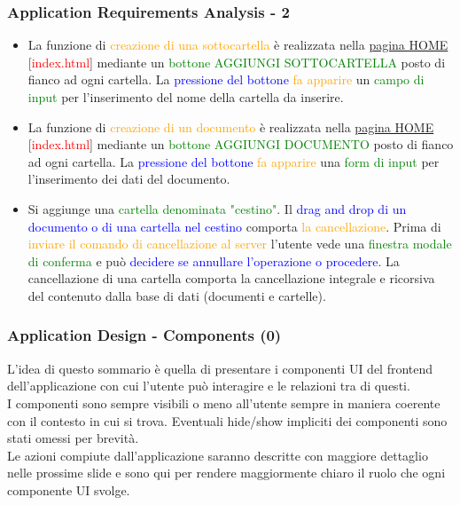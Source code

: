 \documentclass[aspectratio=169, dvipsnames]{beamer}
\begin{document}
\begin{frame}
    \frametitle{Application Requirements Analysis - 2}
    \begin{itemize}
        \item La funzione di \textcolor{Orange}{creazione di una sottocartella} è realizzata nella
              \underline{pagina HOME} [\textcolor{Red}{index.html}] mediante un
              \textcolor{Green}{bottone AGGIUNGI SOTTOCARTELLA} posto di fianco ad ogni cartella. La
              \textcolor{Blue}{pressione del bottone} \textcolor{Orange}{fa apparire} un
              \textcolor{Green}{campo di input} per l'inserimento del nome della cartella da inserire.
        \item La funzione di \textcolor{Orange}{creazione di un documento} è realizzata nella
              \underline{pagina HOME} [\textcolor{Red}{index.html}] mediante un
              \textcolor{Green}{bottone AGGIUNGI DOCUMENTO} posto di fianco ad ogni cartella.
              La \textcolor{Blue}{pressione del bottone} \textcolor{Orange}{fa apparire}
              una \textcolor{Green}{form di input} per l'inserimento dei dati del documento.
        \item Si aggiunge una \textcolor{Green}{cartella denominata "cestino"}. Il
              \textcolor{Blue}{drag and drop di un documento o di una cartella nel cestino} comporta
              \textcolor{Orange}{la cancellazione}. Prima di
              \textcolor{Orange}{inviare il comando di cancellazione al server} l'utente vede una
              \textcolor{Green}{finestra modale di conferma} e può
              \textcolor{Blue}{decidere se annullare l'operazione o procedere}. La cancellazione di una cartella
              comporta la cancellazione integrale e ricorsiva del contenuto dalla base di dati (documenti e cartelle).
    \end{itemize}
\end{frame}

\begin{frame}
    \frametitle{Application Design - Components (0)}
    L'idea di questo sommario è quella di presentare i componenti UI del frontend dell'applicazione con cui l'utente
    può interagire e le relazioni tra di questi.\\
    I componenti sono sempre visibili o meno all'utente sempre in maniera coerente con il contesto in cui si trova.
    Eventuali hide/show impliciti dei componenti sono stati omessi per brevità.\\
    Le azioni compiute dall'applicazione saranno descritte con maggiore dettaglio nelle prossime slide e sono qui
    per rendere maggiormente chiaro il ruolo che ogni componente UI svolge.\\
\end{frame}
\end{document}
